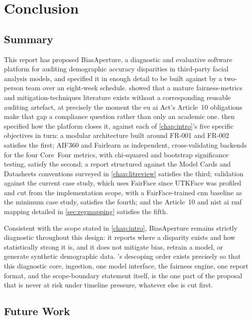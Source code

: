 \chapter{Conclusion}
\label{chap:conclusion}

\section{Summary}

This report has proposed BiasAperture, a diagnostic and evaluative software platform for auditing demographic accuracy disparities in third-party facial analysis models, and specified it in enough detail to be built against by a two-person team over an eight-week schedule.  showed that a mature fairness-metrics and mitigation-techniques literature exists without a corresponding reusable auditing artefact, at precisely the moment the \gls{eu} \gls{ai} Act's Article~10 obligations make that gap a compliance question rather than only an academic one.  then specified how the platform closes it, against each of \cref{chap:intro}'s five specific objectives in turn: a modular architecture built around FR-001 and FR-002 satisfies the first; AIF360 and Fairlearn as independent, cross-validating backends for the four Core~Four metrics, with chi-squared and bootstrap significance testing, satisfy the second; a report structured against the Model Cards and Datasheets conventions surveyed in \cref{chap:litreview} satisfies the third; validation against the current case study, which uses FairFace since UTKFace was profiled and cut from the implementation scope, with a FairFace-trained \gls{cnn} baseline as the minimum case study, satisfies the fourth; and the Article~10 and \gls{nist} \gls{ai} \gls{rmf} mapping detailed in \cref{sec:regmapping} satisfies the fifth.

Consistent with the scope stated in \cref{chap:intro}, BiasAperture remains strictly diagnostic throughout this design: it reports where a disparity exists and how statistically strong it is, and it does not mitigate bias, retrain a model, or generate synthetic demographic data. 's descoping order exists precisely so that this diagnostic core, ingestion, one model interface, the fairness engine, one report format, and the scope-boundary statement itself, is the one part of the proposal that is never at risk under timeline pressure, whatever else is cut first.

\section{Future Work}

